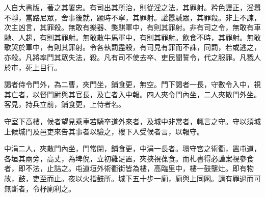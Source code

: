 \begin{pinyinscope}
人自大書版，著之其署忠。有司出其所治，則從淫之法，其罪射。矜色謾正，淫囂不靜，當路尼眾，舍事後就，踰時不寧，其罪射。讙囂駴眾，其罪殺。非上不諫，次主凶言，其罪殺。無敢有樂器、獘騏軍中，有則其罪射。非有司之令，無敢有車馳、人趨，有則其罪射。無敢散牛馬軍中，有則其罪射。飲食不時，其罪射。無敢歌哭於軍中，有則其罪射。令各執罰盡殺，有司見有罪而不誅，同罰，若或逃之，亦殺。凡將率鬥其眾失法，殺。凡有司不使去卒、吏民聞誓令，代之服罪。凡戮人於市，死上目行。

謁者侍令門外，為二曹，夾門坐，鋪食更，無空。門下謁者一長，守數令入中，視其亡者，以督門尉與其官長，及亡者入中報。四人夾令門內坐，二人夾散門外坐。客見，持兵立前，鋪食更，上侍者名。

守室下高樓，候者望見乘車若騎卒道外來者，及城中非常者，輒言之守。守以須城上候城門及邑吏來告其事者以驗之，樓下人受候者言，以報守。

中涓二人，夾散門內坐，門常閉，鋪食更，中涓一長者。環守宮之術衢，置屯道，各垣其兩旁，高丈，為埤倪，立初雞足置，夾挾視葆食。而札書得必謹案視參食者，即不法，止詰之。屯道垣外術衢街皆為樓，高臨里中，樓一鼓壟灶。即有物故，鼓，吏至而止。夜以火指鼓所。城下五十步一廁，廁與上同圂。請有罪過而可無斷者，令杼廁利之。


\end{pinyinscope}